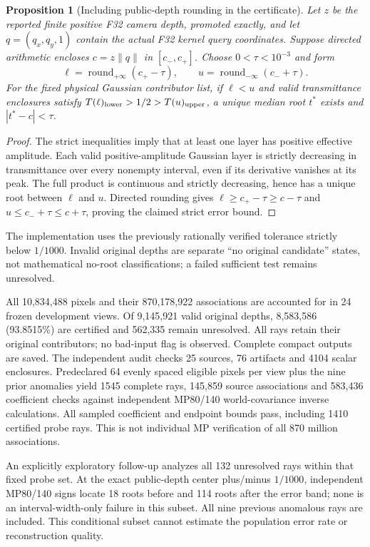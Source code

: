 \documentclass[11pt,a4paper]{article}
\newtheorem{proposition}[theorem]{Proposition}
\begin{document}
\begin{proposition}[Including public-depth rounding in the certificate]
Let $z$ be the reported finite positive F32 camera depth, promoted exactly,
and let $q=(q_x,q_y,1)$ contain the actual F32 kernel query coordinates.
Suppose directed arithmetic encloses $c=z\|q\|$ in $[c_-,c_+]$.
Choose $0<\tau<10^{-3}$ and form
\[
 \ell=\operatorname{round}_{+\infty}(c_+-\tau),\qquad
 u=\operatorname{round}_{-\infty}(c_-+\tau).
\]
For the fixed physical Gaussian contributor list, if $\ell<u$ and valid
transmittance enclosures satisfy
$T(\ell)_{\rm lower}>1/2>T(u)_{\rm upper}$, a unique median root $t^*$ exists
and $|t^*-c|<\tau$.
\end{proposition}
\begin{proof}
The strict inequalities imply that at least one layer has positive
effective amplitude. Each valid positive-amplitude Gaussian layer is
strictly decreasing in transmittance over every nonempty interval, even
if its derivative vanishes at its peak. The full product is continuous and
strictly decreasing, hence has a unique root between $\ell$ and $u$.
Directed rounding gives $\ell\geq c_+-\tau\geq c-\tau$ and
$u\leq c_-+\tau\leq c+\tau$, proving the claimed strict error bound.
\end{proof}
The implementation uses the previously rationally verified tolerance
strictly below $1/1000$. Invalid original depths are separate ``no original
candidate'' states, not mathematical no-root classifications; a failed
sufficient test remains unresolved.

All 10,834,488 pixels and their 870,178,922 associations are accounted for
in 24 frozen development views. Of 9,145,921 valid original depths,
8,583,586 (93.8515\%) are certified and 562,335 remain unresolved.
All rays retain their original contributors; no bad-input flag is observed.
Complete compact outputs are saved. The independent audit checks 25 sources,
76 artifacts and 4104 scalar enclosures. Predeclared 64 evenly spaced
eligible pixels per view plus the nine prior anomalies yield 1545 complete
rays, 145,859 source associations and 583,436 coefficient checks against
independent MP80/140 world-covariance inverse calculations. All sampled
coefficient and endpoint bounds pass, including 1410 certified probe rays.
This is not individual MP verification of all 870 million associations.

An explicitly exploratory follow-up analyzes all 132 unresolved rays within
that fixed probe set. At the exact public-depth center plus/minus $1/1000$,
independent MP80/140 signs locate 18 roots before and 114 roots after the
error band; none is an interval-width-only failure in this subset. All nine
previous anomalous rays are included. This conditional subset cannot
estimate the population error rate or reconstruction quality.
\end{document}
